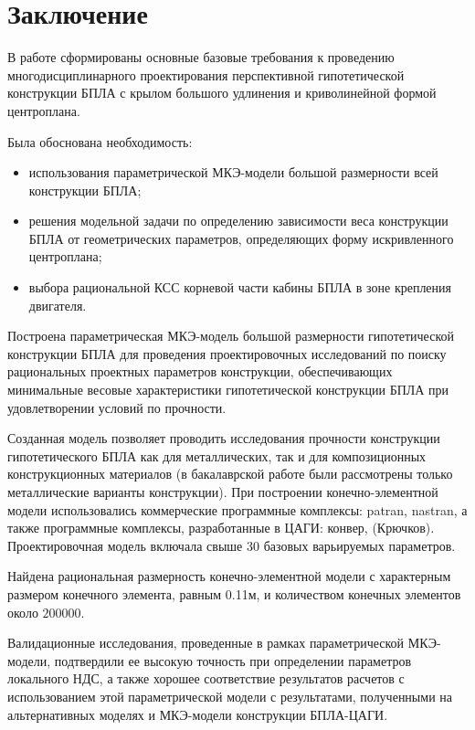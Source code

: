 \chapter*{Заключение}

В работе сформированы основные базовые требования к проведению многодисциплинарного проектирования перспективной гипотетической конструкции БПЛА с крылом большого удлинения и криволинейной формой центроплана. 

Была обоснована необходимость:
\begin{itemize}
\item использования параметрической МКЭ-модели большой размерности всей конструкции БПЛА;
\item решения модельной задачи по определению зависимости веса конструкции БПЛА от геометрических параметров, определяющих форму искривленного центроплана;
\item выбора рациональной КСС корневой части кабины БПЛА в зоне крепления двигателя.
\end{itemize}

Построена параметрическая МКЭ-модель большой размерности гипотетической конструкции БПЛА для проведения проектировочных исследований по поиску рациональных проектных параметров конструкции, обеспечивающих минимальные весовые характеристики гипотетической конструкции БПЛА при удовлетворении условий по прочности. 

Созданная модель позволяет проводить исследования прочности конструкции гипотетического БПЛА как для металлических, так и для композиционных конструкционных материалов (в бакалаврской работе были рассмотрены только металлические варианты конструкции). При построении конечно-элементной модели использовались коммерческие программные комплексы: patran, nastran, а также программные комплексы, разработанные в ЦАГИ: конвер, (Крючков).
Проектировочная модель  включала свыше 30 базовых варьируемых параметров. 

Найдена рациональная размерность конечно-элементной модели с характерным размером конечного элемента, равным 0.11м, и количеством конечных элементов около $200000$. 

Валидационные исследования, проведенные в рамках параметрической МКЭ-модели, подтвердили ее высокую точность при определении параметров локального НДС, а также хорошее соответствие результатов расчетов с использованием этой параметрической модели с результатами, полученными на альтернативных моделях и МКЭ-модели конструкции БПЛА-ЦАГИ. 


